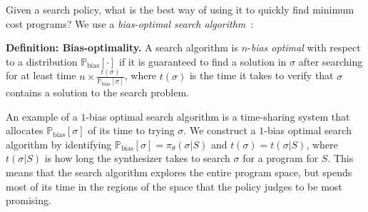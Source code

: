 \documentclass{article}
\newcommand{\probability}{\mathds{P}} %
\theoremstyle{definition}
\begin{document}
Given a search policy, what is the best way of using it to quickly find minimum cost programs?
We use a \emph{bias-optimal search algorithm}~\citep{schmidhuber2004optimal}:

\noindent\textbf{Definition: Bias-optimality.} 
   A search algorithm is $n$-\emph{bias optimal}
with respect to a distribution $\probability_{\text{bias}}[\cdot ]$ if it is
guaranteed to find a solution in $\sigma $ after searching for at least time
$n\times\frac{t(\sigma )}{\probability_{\text{bias}}[\sigma ]}$, where $t(\sigma )$ is the time it
takes to verify that $\sigma $ contains a solution to the
search problem.




An example of a $1$-bias optimal search algorithm is a time-sharing system that allocates $\probability_{\text{bias}}[\sigma ]$ of its time to trying $\sigma $. We construct a $1$-bias optimal search algorithm by identifying $\probability_{\text{bias}}[\sigma ] = \pi_\theta(\sigma |S)$ and $t(\sigma )  = t(\sigma|S)$, where $t(\sigma|S)$ is how long the synthesizer takes to search $\sigma $ for a program for $S$. This means that the search algorithm explores the entire program space, but spends most of its time in the regions of the space that  the policy judges to be most promising.
\end{document}
